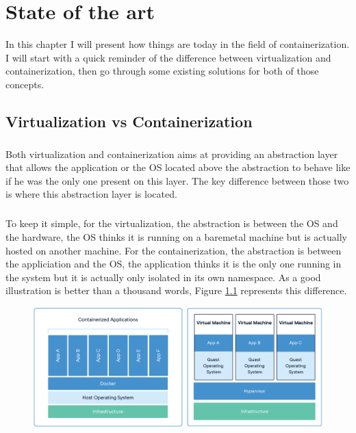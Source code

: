 \chapter{State of the art}

In this chapter I will present how things are today in the field of containerization.  I will start with a quick reminder of the difference between virtualization and containerization, then go through some existing solutions for both of those concepts.

\section{Virtualization vs Containerization}
\paragraph{}Both virtualization and containerization aims at providing an abstraction layer that allows the application or the OS located above the abstraction to behave like if he was the only one present on this layer.  The key difference between those two is where this abstraction layer is located.  

\paragraph{}To keep it simple, for the virtualization, the abstraction is between the OS and the hardware, the OS thinks it is running on a baremetal machine but is actually hosted on another machine.  For the containerization, the abstraction is between the appliciation and the OS, the application thinks it is the only one running in the system but it is actually only isolated in its own namespace.  As a good illustration is better than a thousand words, Figure \ref{fig:virt-vs-cont} represents this difference. 
\begin{figure}[!h]
  \begin{center}
    \includegraphics[width=\linewidth]{images/Virtualization-Containerization.png}
    \caption{\cite{docker}}
    \label{fig:virt-vs-cont}
  \end{center}
\end{figure}

